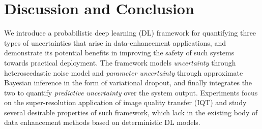 \section{Discussion and Conclusion}

We introduce a probabilistic deep learning (DL) framework for quantifying three types of uncertainties that arise in data-enhancement applications, and demonstrate its potential benefits in improving the safety of such systems towards practical deployment. The framework models \textit{ uncertainty} through heteroscedastic noise model and \textit{parameter uncertainty} through approximate Bayesian inference in the form of variational dropout, and finally integrates the two to quantify \textit{predictive uncertainty} over the system output.  Experiments focus on the super-resolution application of image quality transfer (IQT)\cite{alexander2017image} and study several desirable properties of such framework, which lack in the existing body of data enhancement methods based on deterministic DL models. 

